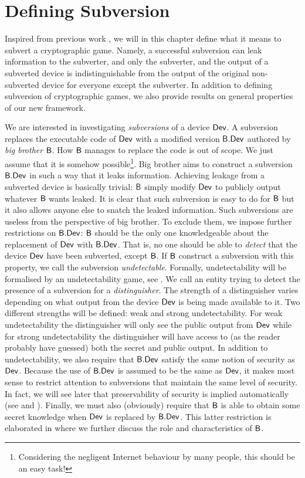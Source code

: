 \chapter{Defining Subversion}

Inspired from previous work \cite{DBLP:conf/crypto/YoungY96,DBLP:secSym}, we will in this chapter define what it means to subvert a cryptographic game. Namely, a successful subversion can leak information to the subverter, and only the subverter, and the output of a subverted device  is indistinguishable from the output of the original non-subverted device for everyone except the subverter. In addition to defining subversion of cryptographic games, we also provide results on general properties of our new framework.

We are interested in investigating \emph{subversions} of a device $\operatorname{\mathsf{Dev}}$. A subversion replaces the executable code of $\operatorname{\mathsf{Dev}}$ with a modified version $\mathsf{B}.\mathsf{Dev}$ authored by \emph{big brother} $\mathsf{B}$. How $\mathsf{B}$ manages to replace the code is out of scope. We just assume that it is somehow possible\footnote{Considering the negligent Internet behaviour by many people, this should be an easy task!}. Big brother aims to construct a subversion $\mathsf{B}.\mathsf{Dev}$ in such a way that it leaks information. Achieving leakage from a subverted device is basically trivial: $\mathsf{B}$ simply modify $\operatorname{\mathsf{Dev}}$ to publicly output whatever $\mathsf{B}$ wants leaked. It is clear that such subversion is easy to do for $\mathsf{B}$ but it also allows anyone else to snatch the leaked information. Such subversions are useless from the perspective of big brother. To exclude them, we impose further restrictions on $\mathsf{B}.\mathsf{Dev}$: $\mathsf{B}$ should be the only one knowledgeable about the replacement of $\operatorname{\mathsf{Dev}}$ with $\mathsf{B}.\mathsf{Dev}$. That is, no one should be able to \emph{detect} that the device $\operatorname{\mathsf{Dev}}$ have been subverted, except $\mathsf{B}$. If $\mathsf{B}$ construct a subversion with this property, we call the subversion \emph{undetectable}. Formally, undetectability will be formalised by an undetectability game, see . We call an entity trying to detect the presence of a subversion for a \emph{distinguisher}. The strength of a distinguisher varies depending on what output from the device $\operatorname{\mathsf{Dev}}$ is being made available to it. Two different strengths will be defined: weak and strong undetectability. For weak undetectability the distinguisher will only see the public output from $\operatorname{\mathsf{Dev}}$ while for strong undetectability the distinguisher will have access to (as the reader probably have guessed) both the secret and public output. In addition to undetectability, we also require that $\mathsf{B}.\mathsf{Dev}$ satisfy the same notion of security as $\operatorname{\mathsf{Dev}}$. Because the use of $\mathsf{B}.\mathsf{Dev}$ is assumed to be the same as $\operatorname{\mathsf{Dev}}$, it makes most sense to restrict attention to subversions that maintain the same level of security. In fact, we will see later that preservability of security is implied automatically (see  and ). Finally, we must also (obviously) require that $\mathsf{B}$ is able to obtain some secret knowledge when $\operatorname{\mathsf{Dev}}$ is replaced by $\mathsf{B}.\mathsf{Dev}$. This latter restriction is elaborated in  where we further discuss the role and characteristics of $\mathsf{B}$. 